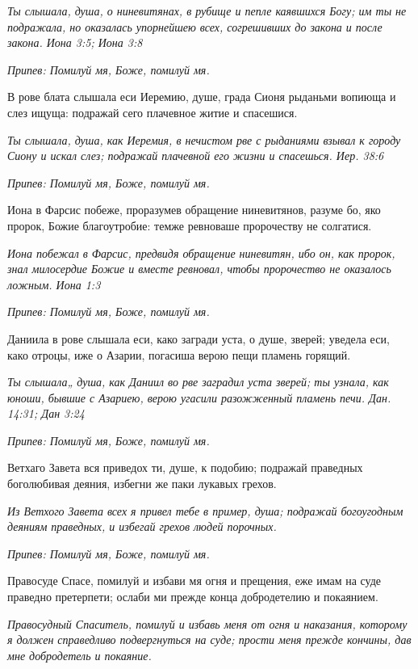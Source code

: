 \itshape Ты слышала, душа, о ниневитянах, в рубище и пепле каявшихся Богу; им ты не подражала, но оказалась упорнейшею всех, согрешивших до закона и после закона. Иона 3:5; Иона 3:8\normalfont{}


\itshape Припев:\normalfont{} Помилуй мя, Боже, помилуй мя.


В рове блата слышала еси Иеремию, душе, града Сионя рыданьми вопиюща и слез ищуща: подражай сего плачевное житие и спасешися.


\itshape Ты слышала, душа, как Иеремия, в нечистом рве с рыданиями взывал к городу Сиону и искал слез; подражай плачевной его жизни и спасешься. Иер. 38:6\normalfont{}


\itshape Припев:\normalfont{} Помилуй мя, Боже, помилуй мя.


Иона в Фарсис побеже, проразумев обращение ниневитянов, разуме бо, яко пророк, Божие благоутробие: темже ревноваше пророчеству не солгатися.


\itshape Иона побежал в Фарсис, предвидя обращение ниневитян, ибо он, как пророк, знал милосердие Божие и вместе ревновал, чтобы пророчество не оказалось ложным. Иона 1:3\normalfont{}


\itshape Припев:\normalfont{} Помилуй мя, Боже, помилуй мя.


Даниила в рове слышала еси, како загради уста, о душе, зверей; уведела еси, како отроцы, иже о Азарии, погасиша верою пещи пламень горящий.


\itshape Ты слышала„ душа, как Даниил во рве заградил уста зверей; ты узнала, как юноши, бывшие с Азариею, верою угасили разожженный пламень печи. Дан. 14:31; Дан 3:24\normalfont{}


\itshape Припев:\normalfont{} Помилуй мя, Боже, помилуй мя.


Ветхаго Завета вся приведох ти, душе, к подобию; подражай праведных боголюбивая деяния, избегни же паки лукавых грехов.


\itshape Из Ветхого Завета всех я привел тебе в пример, душа; подражай богоугодным деяниям праведных, и избегай грехов людей порочных.\normalfont{}


\itshape Припев:\normalfont{} Помилуй мя, Боже, помилуй мя.


Правосуде Спасе, помилуй и избави мя огня и прещения, еже имам на суде праведно претерпети; ослаби ми прежде конца добродетелию и покаянием.


\itshape Правосудный Спаситель, помилуй и избавь меня от огня и наказания, которому я должен справедливо подвергнуться на суде; прости меня прежде кончины, дав мне добродетель и покаяние.\normalfont{}


